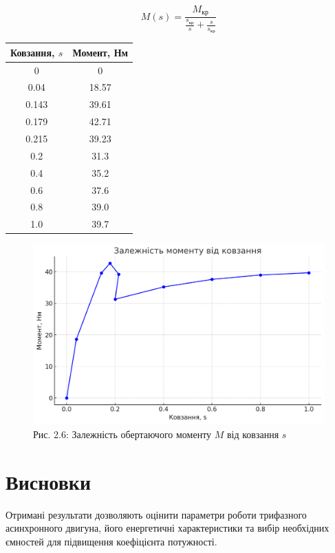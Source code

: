 \documentclass[a4paper]{article}
\begin{document}
\[
M(s) = \frac{M_{\text{кр}}}{\frac{s_{\text{кр}}}{s} + \frac{s}{s_{\text{кр}}}}
\]

\newpage

\begin{longtable}{|c|c|}
\hline
\textbf{Ковзання, $s$} & \textbf{Момент, Нм} \\
\hline
0 & 0 \\
0.04 & 18.57 \\
0.143 & 39.61 \\
0.179 & 42.71 \\
0.215 & 39.23 \\
0.2 & 31.3 \\
0.4 & 35.2 \\
0.6 & 37.6 \\
0.8 & 39.0 \\
1.0 & 39.7 \\
\hline
\end{longtable}


\begin{figure}[h]
    \centering
    \includegraphics[width=1\textwidth]{imgs/LW2.5.png}
    \caption*{Рис. 2.6: Залежність обертаючого моменту $M$ від ковзання $s$}
\end{figure} 


\section*{Висновки}

Отримані результати дозволяють оцінити параметри роботи трифазного асинхронного двигуна, його енергетичні характеристики та вибір необхідних ємностей для підвищення коефіцієнта потужності.
\end{document}
